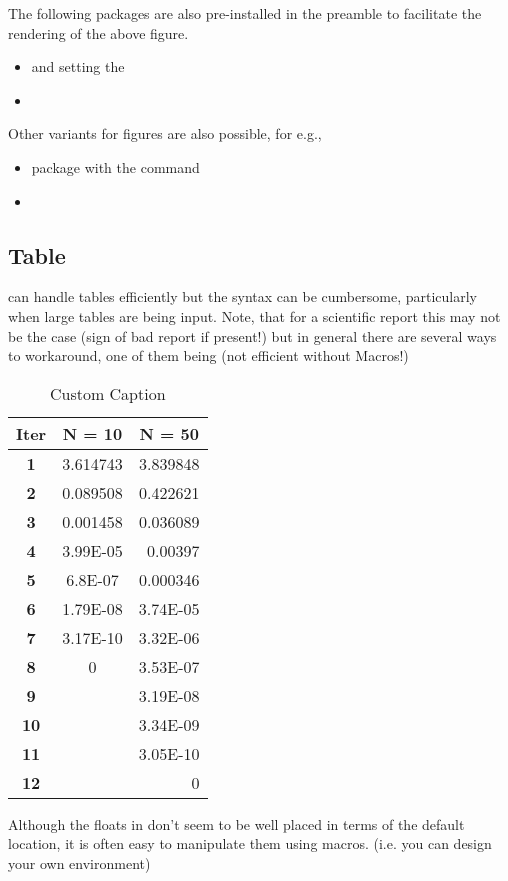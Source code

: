 The following packages are also pre-installed in the preamble to facilitate the rendering of the above figure. 
\begin{itemize}
\item {} and setting the 
\item {}
\end{itemize}
Other variants for figures are also possible, for e.g., 
\begin{itemize}
\item {} package with the command 
\item {}
\end{itemize}\newpage
\subsection{Table}
\latex can handle tables efficiently but the syntax can  be cumbersome, particularly when large tables are being input. Note, that for a scientific report this may not be the case (sign of bad report if present!) but in general there are several ways to workaround, one of them being  (not efficient without Macros!)
\begin{table}[ht]
  \centering
  \caption{Custom Caption}
    \begin{tabular}{ccr}
    \toprule
    \textbf{Iter} & \textbf{N = 10} & \multicolumn{1}{c}{\textbf{N = 50}} \\
    \midrule
    \textbf{1} & 3.614743 & 3.839848 \\
    \textbf{2} & 0.089508 & 0.422621 \\
    \textbf{3} & 0.001458 & 0.036089 \\
    \textbf{4} & 3.99E-05 & 0.00397 \\
    \textbf{5} & 6.8E-07 & 0.000346 \\
    \textbf{6} & 1.79E-08 & 3.74E-05 \\
    \textbf{7} & 3.17E-10 & 3.32E-06 \\
    \textbf{8} & 0     & 3.53E-07 \\
    \textbf{9} &       & 3.19E-08 \\
    \textbf{10} &       & 3.34E-09 \\
    \textbf{11} &       & 3.05E-10 \\
    \textbf{12} &       & 0 \\
    \bottomrule
    \end{tabular}%
  \label{table1}
\end{table}
Although the floats in \latex don't seem to be well placed in terms of the default location, it is often easy to manipulate them using macros. (i.e. you can design your own  environment)
